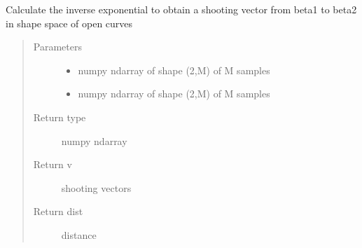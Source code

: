 \documentclass[letterpaper,10pt,english]{sphinxmanual}
\begin{document}
\begin{fulllineitems}
\label{\detokenize{curve_functions:curve_functions.inverse_exp_coord}}
Calculate the inverse exponential to obtain a shooting vector from
beta1 to beta2 in shape space of open curves
\begin{quote}\begin{description}
\item[{Parameters}] \leavevmode\begin{itemize}
\item {} 
 \textendash{} numpy ndarray of shape (2,M) of M samples

\item {} 
 \textendash{} numpy ndarray of shape (2,M) of M samples

\end{itemize}

\item[{Return type}] \leavevmode
numpy ndarray

\item[{Return v}] \leavevmode
shooting vectors

\item[{Return dist}] \leavevmode
distance

\end{description}\end{quote}

\end{fulllineitems}

\end{document}
